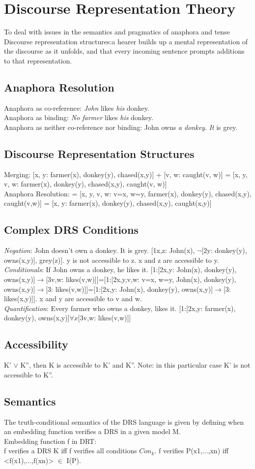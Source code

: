 \section{Discourse Representation Theory}
To deal with issues in the semantics and pragmatics of anaphora and tense\\
Discourse representation structures:a hearer builds up a mental representation of the discourse as it unfolds, and that every incoming sentence prompts additions to that representation. 
\subsection*{Anaphora Resolution}
Anaphora as co-reference: \emph{John} likes \emph{his} donkey.\\
Anaphora as binding: \emph{No farmer} likes \emph{his} donkey.\\
Anaphora as neither co-reference nor binding: John owns \emph{a donkey}. \emph{It} is grey.\\
\subsection*{Discourse Representation Structures}
Merging: [x, y: farmer(x), donkey(y), chased(x,y)] + [v, w: caught(v, w)] = [x, y, v, w: farmer(x), donkey(y), chased(x,y), caught(v, w)]\\
Anaphora Resolution: = [x, y, v, w: v=x, w=y, farmer(x), donkey(y), chased(x,y), caught(v,w)] = [x, y: farmer(x), donkey(y), chased(x,y), caught(x,y)]
\subsection*{Complex DRS Conditions}
\emph{Negation}: John doesn't own a donkey. It is grey. [1x,z: John(x), $\neg$[2y: donkey(y), owns(x,y)], grey(z)]. y is not accessible to z. x and z are accessible to y.\\
\emph{Conditionals}: If John owns a donkey, he likes it. [1:[2x,y: John(x), donkey(y), owns(x,y)]$\to$[3v,w: likes(v,w)]]=[1:[2x,y,v,w: v=x, w=y, John(x), donkey(y), owns(x,y)]$\to$[3: likes(v,w)]]=[1:[2x,y: John(x), donkey(y), owns(x,y)]$\to$[3: likes(x,y)]]. x and y are accessible to v and w.\\
\emph{Quantification}: Every farmer who owns a donkey, likes it. [1:[2x,y: farmer(x), donkey(y), owns(x,y)]$\forall x$[3v,w: likes(v,w)]]
\subsection*{Accessibility}
K' $\lor$ K'', then K is accessible to K' and K''. Note: in this particular case K' is not accessible to K''.
\subsection*{Semantics}
The truth-conditional semantics of the DRS language is given by defining when an embedding function verifies a DRS in a given model M.\\
Embedding function f in DRT:\\
f verifies a DRS K iff f verifies all conditions $Con_k$. f verifies P(x1,...,xn) iff <f(x1),...,f(xn)> $\in$ I(P).
